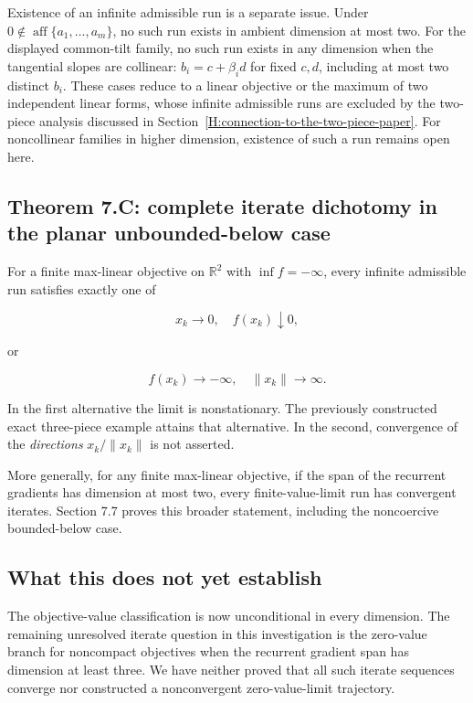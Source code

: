 Existence of an infinite admissible run is a separate issue. Under
\(0\notin\operatorname{aff}\{a_1,\ldots,a_m\}\), no such run exists
in ambient dimension at most two. For the displayed common-tilt family,
no such run exists in any dimension when the tangential slopes are collinear:
\(b_i=c+\beta_i d\) for fixed \(c,d\), including at most two distinct \(b_i\).
These cases reduce to a linear objective or the maximum of two independent
linear forms, whose infinite admissible runs are excluded by the two-piece
analysis discussed in Section~\ref{H:connection-to-the-two-piece-paper}.
For noncollinear families in higher dimension, existence of such a run
remains open here.



\subsection{Theorem 7.C: complete iterate dichotomy in the planar
unbounded-below
case}\label{H:theorem-c-complete-iterate-dichotomy-in-the-planar-unbounded-below-case}

For a finite max-linear objective on \(\mathbb R^2\) with
\(\inf f=-\infty\), every infinite admissible run satisfies exactly one
of

\[
\boxed{x_k\longrightarrow0,\quad f(x_k)\downarrow0,}
\]

or

\[
\boxed{f(x_k)\longrightarrow-\infty,\quad\|x_k\|\longrightarrow\infty.}
\]

In the first alternative the limit is nonstationary. The previously
constructed exact three-piece example attains that alternative. In the
second, convergence of the \emph{directions} \(x_k/\|x_k\|\) is not
asserted.

More generally, for any finite max-linear objective, if the span of the
recurrent gradients has dimension at most two, every finite-value-limit
run has convergent iterates. Section 7.7 proves this broader statement,
including the noncoercive bounded-below case.



\subsection{What this does not yet
establish}\label{H:what-this-does-not-yet-establish}

The objective-value classification is now unconditional in every
dimension. The remaining unresolved iterate question in this
investigation is the zero-value branch for noncompact objectives when
the recurrent gradient span has dimension at least three. We have
neither proved that all such iterate sequences converge nor constructed
a nonconvergent zero-value-limit trajectory.

